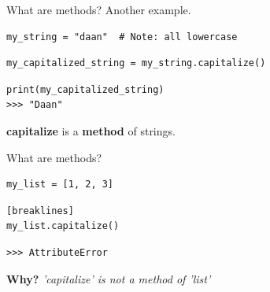 \begin{frame}[fragile]{What are methods? Another example.}
\pause
\begin{verbatim}
my_string = "daan"  # Note: all lowercase
\end{verbatim} 
\pause
\begin{verbatim}
my_capitalized_string = my_string.capitalize()
\end{verbatim}
\pause
\begin{verbatim}
print(my_capitalized_string)
>>> "Daan"
\end{verbatim} 
\pause
\textbf{capitalize} is a \textbf{method} of {strings}.
\end{frame}

\begin{frame}[fragile]{What are methods?}
\pause
\begin{verbatim}
my_list = [1, 2, 3]
\end{verbatim} 
\pause
\begin{verbatim}[breaklines]
my_list.capitalize()
\end{verbatim}
\pause
\begin{verbatim}
>>> AttributeError
\end{verbatim} 
\pause
\textbf{Why?}
\textit{'capitalize' is not a method of 'list'}
\end{frame}

